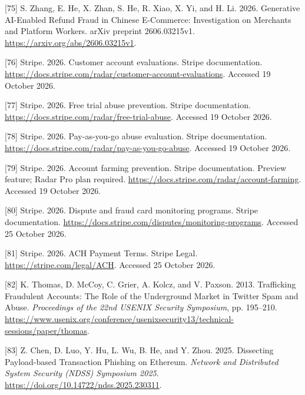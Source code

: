 \documentclass[
  11pt,
]{article}
\newlength{\cslhangindent}
\newlength{\cslentryspacingunit} %
\newenvironment{CSLReferences}[2] %
 {%
  \setlength{\parindent}{0pt}
  \ifodd #1
  \let\oldpar\par
  \def\par{\hangindent=\cslhangindent\oldpar}
  \fi
  \setlength{\parskip}{#2\cslentryspacingunit}
 }%
 {}
\begin{document}
\begin{CSLReferences}{1}{1}
\leavevmode{}%
{[}75{]} S. Zhang, E. He, X. Zhan, S. He, R. Xiao, X. Yi, and H. Li.
2026. Generative AI-Enabled Refund Fraud in Chinese E-Commerce:
Investigation on Merchants and Platform Workers. arXiv preprint
2606.03215v1. \url{https://arxiv.org/abs/2606.03215v1}.

\leavevmode{}%
{[}76{]} Stripe. 2026. Customer account evaluations. Stripe
documentation.
\url{https://docs.stripe.com/radar/customer-account-evaluations}.
Accessed 19 October 2026.

\leavevmode{}%
{[}77{]} Stripe. 2026. Free trial abuse prevention. Stripe
documentation. \url{https://docs.stripe.com/radar/free-trial-abuse}.
Accessed 19 October 2026.

\leavevmode{}%
{[}78{]} Stripe. 2026. Pay-as-you-go abuse evaluation. Stripe
documentation. \url{https://docs.stripe.com/radar/pay-as-you-go-abuse}.
Accessed 19 October 2026.

\leavevmode{}%
{[}79{]} Stripe. 2026. Account farming prevention. Stripe documentation.
Preview feature; Radar Pro plan required.
\url{https://docs.stripe.com/radar/account-farming}. Accessed 19 October
2026.

\leavevmode{}%
{[}80{]} Stripe. 2026. Dispute and fraud card monitoring programs.
Stripe documentation.
\url{https://docs.stripe.com/disputes/monitoring-programs}. Accessed 25
October 2026.

\leavevmode{}%
{[}81{]} Stripe. 2026. ACH Payment Terms. Stripe Legal.
\url{https://stripe.com/legal/ACH}. Accessed 25 October 2026.

\leavevmode{}%
{[}82{]} K. Thomas, D. McCoy, C. Grier, A. Kolcz, and V. Paxson. 2013.
Trafficking Fraudulent Accounts: The Role of the Underground Market in
Twitter Spam and Abuse. \emph{Proceedings of the 22nd USENIX Security
Symposium}, pp. 195--210.
\url{https://www.usenix.org/conference/usenixsecurity13/technical-sessions/paper/thomas}.

\leavevmode{}%
{[}83{]} Z. Chen, D. Luo, Y. Hu, L. Wu, B. He, and Y. Zhou. 2025.
Dissecting Payload-based Transaction Phishing on Ethereum. \emph{Network
and Distributed System Security (NDSS) Symposium 2025}.
\url{https://doi.org/10.14722/ndss.2025.230311}.


\end{CSLReferences}
\end{document}
